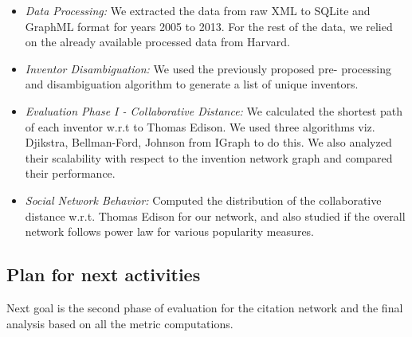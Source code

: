 	\begin{itemize}
		\squish
		\item {\em Data Processing:} We extracted the data from raw XML to SQLite and
		GraphML format for years 2005 to 2013. For the rest of the data, we relied on
		the already available processed data from Harvard.
		\item {\em Inventor Disambiguation:} We used the previously proposed pre-
		processing and disambiguation algorithm to generate a list of unique
		inventors.
		\item {\em Evaluation Phase I - Collaborative Distance:} We calculated the 
		shortest path of each inventor w.r.t to Thomas Edison. We used three
		algorithms viz. Djikstra, Bellman-Ford, Johnson from IGraph to do this. We
		also analyzed their scalability with respect to the invention network graph
		and compared their performance.
		\item {\em Social Network Behavior:} Computed the distribution of the 
		collaborative distance w.r.t. Thomas Edison for our network, and also studied
		if the overall network follows power law for various popularity measures.

	\end{itemize}

\subsection{Plan for next activities}
 
Next goal is the second phase of evaluation for the citation network and the
final analysis based on all the metric computations.

